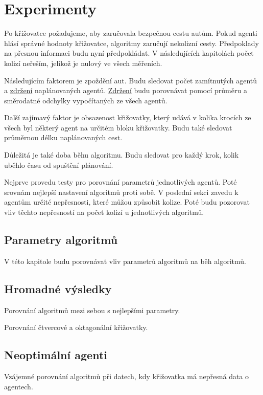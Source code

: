 \chapter{Experimenty}\label{ch:experimenty}


Po křižovatce požadujeme, aby zaručovala bezpečnou cestu autům.
Pokud agenti hlásí správné hodnoty křižovatce, algoritmy zaručují nekolizní cesty.
Předpoklady na přesnou informaci budu nyní předpokládat.
V následujících kapitolách počet kolizí neřeším, jelikož je nulový ve všech měřeních.

Následujícím faktorem je zpoždění aut.
Budu sledovat počet zamítnutých agentů a \hyperref[par:zdrzeni]{zdržení} naplánovaných agentů.
\hyperref[par:zdrzeni]{Zdržení} budu porovnávat pomocí průměru a směrodatné odchylky vypočítaných ze všech agentů.

Další zajímavý faktor je obsazenost křižovatky,
který udává v kolika krocích ze všech byl některý agent na určitém bloku křižovatky.
Budu také sledovat průměrnou délku naplánovaných cest.

Důležitá je také doba běhu algoritmu.
Budu sledovat pro každý krok, kolik uběhlo času od spuštění plánování.

Nejprve provedu testy pro porovnání parametrů jednotlivých agentů.
Poté srovnám nejlepší nastavení algoritmů proti sobě.
V poslední sekci zavedu k agentům určité nepřesnosti, které můžou způsobit kolize.
Poté budu pozorovat vliv těchto nepřesností na počet kolizí u jednotlivých algoritmů.





\section{Parametry algoritmů}\label{sec:parametry_algoritmu}

%

V této kapitole budu porovnávat vliv parametrů algoritmů na běh algoritmů.




\section{Hromadné výsledky}\label{sec:hromadne_vysledky}

Porovnání algoritmů mezi sebou s nejlepšími parametry.

Porovnání čtvercové a oktagonální křižovatky.


\section{Neoptimální agenti}\label{sec:neoptimalni_agenti}

Vzájemné porovnání algoritmů při datech, kdy křižovatka má nepřesná data o agentech.
